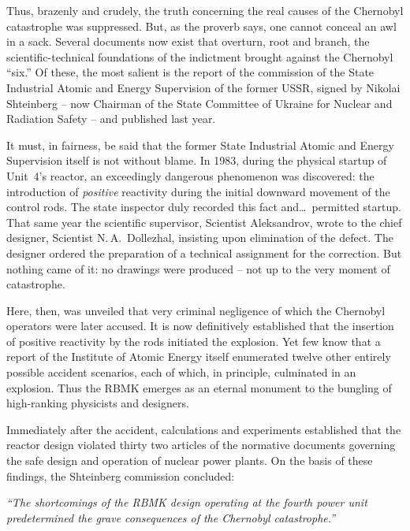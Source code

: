 \documentclass[openright]{bookest}
\begin{document}
Thus, brazenly and crudely, the truth concerning the real causes of the Chernobyl catastrophe was suppressed. But, as the proverb says, one cannot conceal an awl in a sack. Several documents now exist that overturn, root and branch, the scientific-technical foundations of the indictment brought against the Chernobyl ``six.'' Of these, the most salient is the report of the commission of the State Industrial Atomic and Energy Supervision of the former USSR, signed by Nikolai Shteinberg -- now Chairman of the State Committee of Ukraine for Nuclear and Radiation Safety -- and published last year.

It must, in fairness, be said that the former State Industrial Atomic and Energy Supervision itself is not without blame. In 1983, during the physical startup of Unit~4's reactor, an exceedingly dangerous phenomenon was discovered: the introduction of \emph{positive} reactivity during the initial downward movement of the control rods. The state inspector duly recorded this fact and\ldots~permitted startup. That same year the scientific supervisor, Scientist Aleksandrov, wrote to the chief designer, Scientist N.\,A.~Dollezhal, insisting upon elimination of the defect. The designer ordered the preparation of a technical assignment for the correction. But nothing came of it: no drawings were produced -- not up to the very moment of catastrophe.

Here, then, was unveiled that very criminal negligence of which the Chernobyl operators were later accused. It is now definitively established that the insertion of positive reactivity by the rods initiated the explosion. Yet few know that a report of the Institute of Atomic Energy itself enumerated twelve other entirely possible accident scenarios, each of which, in principle, culminated in an explosion. Thus the RBMK emerges as an eternal monument to the bungling of high-ranking physicists and designers.

Immediately after the accident, calculations and experiments established that the reactor design violated thirty two articles of the normative documents governing the safe design and operation of nuclear power plants. On the basis of these findings, the Shteinberg commission concluded:

\begin{personal}
\textit{``The shortcomings of the RBMK design operating at the fourth power unit predetermined the grave consequences of the Chernobyl catastrophe.''}
\end{personal}
\end{document}
